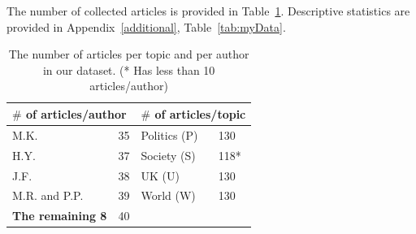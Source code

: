 \documentclass[11pt]{article}
\begin{document}

The number of collected articles is provided in Table~\ref{tab:myData_short}. Descriptive statistics are provided in Appendix~\ref{additional}, Table~\ref{tab:myData}.
\begin{table}[ht]
\caption{The number of articles per topic and per author in our dataset. (* Has less than 10 articles/author)}
    \label{tab:myData_short}
    \centering
    \begin{tabular}{ll |ll }
    \hline 
    \multicolumn{2}{l}{\textbf{$\#$ of articles/author}}   & \multicolumn{2}{|l}{\textbf{$\#$ of articles/topic}}  \\
    \hline
     M.K.                & 35   &  Politics (P) & 130 \\ 
     H.Y.                & 37   &  Society (S)  & 118*  \\
     J.F.                & 38   &  UK (U)       & 130    \\
     M.R. and P.P.       & 39   &  World (W)    & 130    \\
     \textbf{The remaining 8}   & 40 & & \\
     \hline
     \end{tabular}
\end{table}
\end{document}
